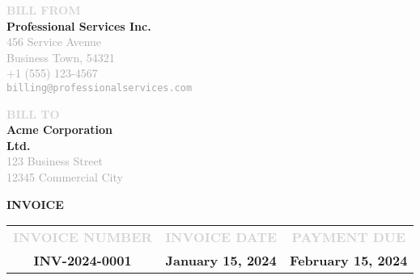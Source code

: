 \documentclass[11pt,a4paper]{article}
\makeatletter
\newcommand{\clientname}{Acme Corporation\\Ltd.}
\newcommand{\clientaddress}{123 Business Street\\12345 Commercial City}
\newcommand{\companyname}{Professional Services Inc.}
\newcommand{\companystreet}{456 Service Avenue}
\newcommand{\companycity}{Business Town, 54321}
\newcommand{\companyphone}{+1 (555) 123-4567}
\newcommand{\companyemail}{billing@professionalservices.com}
\newcommand{\invoicenumber}{INV-2024-0001}
\newcommand{\invoicedate}{January 15, 2024}
\newcommand{\invoicedeadline}{February 15, 2024}
\newcommand{\layoutlabel}[1]{\textbf{\textcolor{lightgray}{\footnotesize\MakeUppercase{#1}}}}
\newcommand{\contactinfo}[1]{\textcolor{darkgray}{\small #1}}
\makeatother
\begin{document}
\noindent
\begin{minipage}[t]{0.47\textwidth}
    \layoutlabel{Bill from}\\[0.3cm]
    {\large\textbf{\companyname}}\\[0.2cm]
    \contactinfo{\companystreet}\\
    \contactinfo{\companycity}\\[0.3cm]
    \contactinfo{\companyphone}\\
    \contactinfo{\texttt{\companyemail}}
\end{minipage}%
\hfill%
\begin{minipage}[t]{0.47\textwidth}
    \begin{flushright}
        \layoutlabel{Bill to}\\[0.3cm]
        {\large\textbf{\clientname}}\\[0.2cm]
        \contactinfo{\clientaddress}
    \end{flushright}
\end{minipage}

\vspace{0.8cm}

\begin{center}
    {\Huge\textbf{\textcolor{primaryblue}{INVOICE}}}
\end{center}

\vspace{0.5cm}

\begin{center}
    \begin{tabular*}{\textwidth}{@{\extracolsep{\fill}}ccc@{}}
        \layoutlabel{Invoice Number} & \layoutlabel{Invoice Date} & \layoutlabel{Payment Due} \\
        \textbf{\invoicenumber} & \textbf{\invoicedate} & \textbf{\invoicedeadline} \\
    \end{tabular*}
\end{center}

\vspace{0.5cm}
\end{document}
